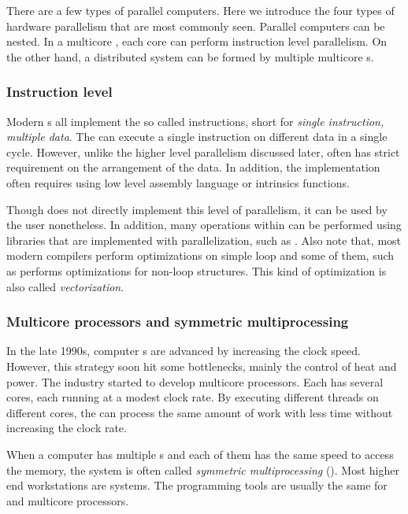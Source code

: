 There are a few types of parallel computers. Here we introduce the four types
of hardware parallelism that are most commonly seen. Parallel computers can be
nested. In a multicore \cpu, each core can perform instruction level
parallelism. On the other hand, a distributed system can be formed by multiple
multicore \cpu{}s.

\subsubsection{Instruction level}
\label{ssub:Instruction level}

Modern \cpu{}s all implement the so called \simd instructions, short for
\emph{single instruction, multiple data}. The \cpu can execute a single
instruction on different data in a single cycle. However, unlike the higher
level parallelism discussed later, \simd often has strict requirement on the
arrangement of the data. In addition, the implementation often requires using
low level assembly language or intrinsics functions.

Though \vsmc does not directly implement this level of parallelism, it can be
used by the user nonetheless. In addition, many operations within \vsmc can be
performed using libraries that are implemented with \simd parallelization,
such as \mkl. Also note that, most modern \cpp compilers perform \simd
optimizations on simple loop and some of them, such as \clang \cite{clang}
performs \simd optimizations for non-loop structures. This kind of
optimization is also called \emph{vectorization}.

\subsubsection{Multicore processors and symmetric multiprocessing}
\label{ssub:Multicore processors and symmetric multiprocessing}

In the late 1990s, computer \cpu{}s are advanced by increasing the clock
speed. However, this strategy soon hit some bottlenecks, mainly the control of
heat and power. The industry started to develop multicore processors. Each
\cpu has several cores, each running at a modest clock rate. By executing
different threads on different cores, the \cpu can process the same amount of
work with less time without increasing the clock rate.

When a computer has multiple \cpu{}s and each of them has the same speed to
access the memory, the system is often called \emph{symmetric multiprocessing}
(\smp). Most higher end workstations are \smp systems. The programming tools
are usually the same for \smp and multicore processors.

